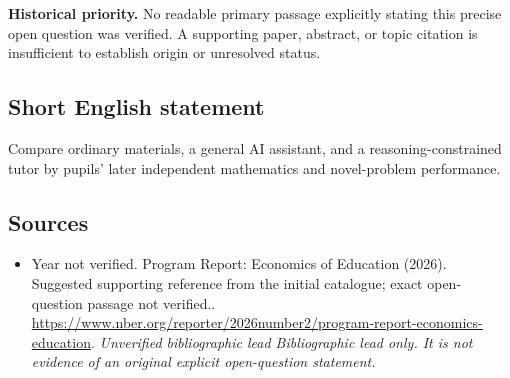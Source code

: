 \documentclass[11pt]{article}
\begin{document}
\par\textbf{Historical priority.} No readable primary passage explicitly stating this precise open question was verified. A supporting paper, abstract, or topic citation is insufficient to establish origin or unresolved status.

\subsection{Short English statement}
Compare ordinary materials, a general AI assistant, and a reasoning-constrained tutor by pupils’ later independent mathematics and novel-problem performance.

\subsection{Sources}
\begin{itemize}\raggedright
\item[\textnormal{[S1]}]\hypertarget{source:30007735:1}{} Year not verified. Program Report: Economics of Education (2026). Suggested supporting reference from the initial catalogue; exact open-question passage not verified..
\url{https://www.nber.org/reporter/2026number2/program-report-economics-education}.
{\small\textit{Unverified bibliographic lead Bibliographic lead only. It is not evidence of an original explicit open-question statement.}}
\end{itemize}
\end{document}
